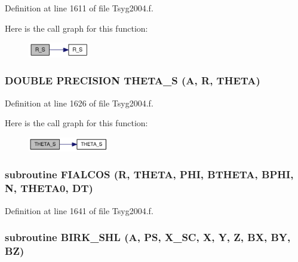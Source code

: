 Definition at line 1611 of file Tsyg2004.f.

Here is the call graph for this function:\nopagebreak
\begin{figure}[H]
\begin{center}
\leavevmode
\includegraphics[width=76pt]{_tsyg2004_8f_a821422093810532210ff6f1aec0920d_cgraph}
\end{center}
\end{figure}
\hypertarget{_tsyg2004_8f_a12656461ac8bbe57d950d6788f8a70a}{
\subsubsection[{THETA\_\-S}]{\setlength{\rightskip}{0pt plus 5cm}DOUBLE PRECISION THETA\_\-S (A, \/  R, \/  THETA)}}
\label{_tsyg2004_8f_a12656461ac8bbe57d950d6788f8a70a}




Definition at line 1626 of file Tsyg2004.f.

Here is the call graph for this function:\nopagebreak
\begin{figure}[H]
\begin{center}
\leavevmode
\includegraphics[width=100pt]{_tsyg2004_8f_a12656461ac8bbe57d950d6788f8a70a_cgraph}
\end{center}
\end{figure}
\hypertarget{_tsyg2004_8f_a235fc0d312a21adba2d5810919adca8}{
\subsubsection[{FIALCOS}]{\setlength{\rightskip}{0pt plus 5cm}subroutine FIALCOS (R, \/  THETA, \/  PHI, \/  BTHETA, \/  BPHI, \/  N, \/  THETA0, \/  DT)}}
\label{_tsyg2004_8f_a235fc0d312a21adba2d5810919adca8}




Definition at line 1641 of file Tsyg2004.f.\hypertarget{_tsyg2004_8f_a921f6b182c2c1697df43273aa36f99e}{
\subsubsection[{BIRK\_\-SHL}]{\setlength{\rightskip}{0pt plus 5cm}subroutine BIRK\_\-SHL (A, \/  PS, \/  X\_\-SC, \/  X, \/  Y, \/  Z, \/  BX, \/  BY, \/  BZ)}}
\label{_tsyg2004_8f_a921f6b182c2c1697df43273aa36f99e}




